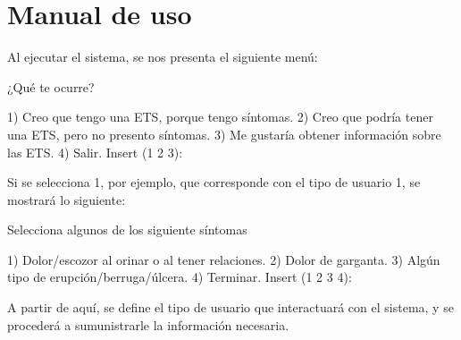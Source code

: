 
\chapter{Manual de uso}

Al ejecutar el sistema, se nos presenta el siguiente menú:

\begin{bashcode}
  ¿Qué te ocurre?

      1) Creo que tengo una ETS, porque tengo síntomas.
      2) Creo que podría tener una ETS, pero no presento síntomas.
      3) Me gustaría obtener información sobre las ETS.
      4) Salir.
  Insert (1 2 3):
\end{bashcode}

Si se selecciona 1, por ejemplo, que corresponde con el tipo de usuario 1, se mostrará lo siguiente:

\begin{bashcode}
  Selecciona algunos de los siguiente síntomas

    1) Dolor/escozor al orinar o al tener relaciones.
    2) Dolor de garganta.
    3) Algún tipo de erupción/berruga/úlcera.
    4) Terminar.
Insert (1 2 3 4):
\end{bashcode}

A partir de aquí, se define el tipo de usuario que interactuará con el sistema, y se procederá a sumunistrarle la información necesaria.
